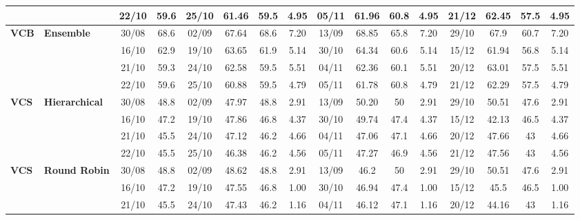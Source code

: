 \documentclass{ieeeaccess}
\begin{document}
\begin{table}[!h]
\begin{tabular}{llcc|cccc|cccc|cccc}
&
& 22/10 & 59.6 & 25/10 & 61.46 & 59.5 & 4.95 & 05/11 & 61.96 & 60.8 & 4.95 & 21/12 & 62.45 & 57.5 & 4.95 \\
\midrule

\multirow{4}{*}{\textbf{VCB}} 
& \textbf{Ensemble}
& 30/08 & 68.6 & 02/09 & 67.64 & 68.6 & 7.20 & 13/09 & 68.85 & 65.8 & 7.20 & 29/10 & 67.9 & 60.7 & 7.20 \\

&
& 16/10 & 62.9 & 19/10 & 63.65 & 61.9 & 5.14 & 30/10 & 64.34 & 60.6 & 5.14 & 15/12 & 61.94 & 56.8 & 5.14 \\

&
& 21/10 & 59.3 & 24/10 & 62.58 & 59.5 & 5.51 & 04/11 & 62.36 & 60.1 & 5.51 & 20/12 & 63.01 & 57.5 & 5.51 \\

&
& 22/10 & 59.6 & 25/10 & 60.88 & 59.5 & 4.79 & 05/11 & 61.78 & 60.8 & 4.79 & 21/12 & 62.29 & 57.5 & 4.79 \\
\midrule



\multirow{4}{*}{\textbf{VCS}} 
& \textbf{Hierarchical}
& 30/08 & 48.8 & 02/09 & 47.97 & 48.8 & 2.91 & 13/09 & 50.20 & 50 & 2.91 & 29/10 & 50.51 & 47.6 & 2.91 \\

&
& 16/10 & 47.2 & 19/10 & 47.86 & 46.8 & 4.37 & 30/10 & 49.74 & 47.4 & 4.37 & 15/12 & 42.13 & 46.5 & 4.37 \\

&
& 21/10 & 45.5 & 24/10 & 47.12 & 46.2 & 4.66 & 04/11 & 47.06 & 47.1 & 4.66 & 20/12 & 47.66 & 43 & 4.66 \\

&
& 22/10 & 45.5 & 25/10 & 46.38 & 46.2 & 4.56 & 05/11 & 47.27 & 46.9 & 4.56 & 21/12 & 47.56 & 43 & 4.56 \\
\midrule


\multirow{4}{*}{\textbf{VCS}} 
& \textbf{Round Robin}
& 30/08 & 48.8 & 02/09 & 48.62 & 48.8 & 2.91 & 13/09 & 46.2 & 50 & 2.91 & 29/10 & 50.51 & 47.6 & 2.91 \\

&
& 16/10 & 47.2 & 19/10 & 47.55 & 46.8 & 1.00 & 30/10 & 46.94 & 47.4 & 1.00 & 15/12 & 45.5 & 46.5 & 1.00 \\

&
& 21/10 & 45.5 & 24/10 & 47.43 & 46.2 & 1.16 & 04/11 & 46.12 & 47.1 & 1.16 & 20/12 & 44.16 & 43 & 1.16 \\


\end{tabular}
\end{table}
\end{document}
